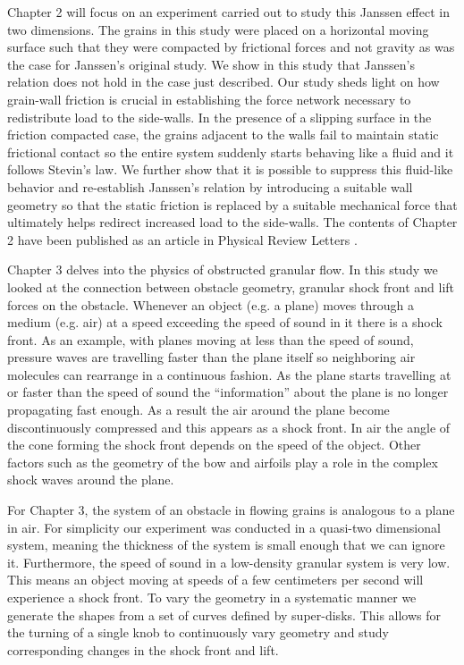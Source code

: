 Chapter 2 will focus on an experiment carried out to study this Janssen effect in two dimensions. The grains in this study were placed on a horizontal moving surface such that they were compacted by frictional forces and not gravity as was the case for Janssen's original study. We show in this study that Janssen's relation does not hold in the case just described. Our study sheds light on how grain-wall friction is crucial in establishing the force network necessary to redistribute load to the side-walls. In the presence of a slipping surface in the friction compacted case, the grains adjacent to the walls fail to maintain static frictional contact so the entire system suddenly starts behaving like a fluid and it follows Stevin's law. We further show that it is possible to suppress this fluid-like behavior and re-establish Janssen's relation by introducing a suitable wall geometry so that the static friction is replaced by a suitable mechanical force that ultimately helps redirect increased load to the side-walls. The contents of Chapter 2 have been published as an article in Physical Review Letters \cite{karim_corwin}. 

Chapter 3 delves into the physics of obstructed granular flow. In this study we looked at the connection between obstacle geometry, granular shock front and lift forces on the obstacle. Whenever an object (e.g. a plane) moves through a medium (e.g. air) at a speed exceeding the speed of sound in it there is a shock front. As an example, with planes moving at less than the speed of sound, pressure waves are travelling faster than the plane itself so neighboring air molecules can rearrange in a continuous fashion. As the plane starts travelling at or faster than the speed of sound the “information” about the plane is no longer propagating fast enough. As a result the air around the plane become discontinuously compressed and this appears as a shock front. In air the angle of the cone forming the shock front depends on the speed of the object. Other factors such as the geometry of the bow and airfoils play a role in the complex shock waves around the plane. 

For Chapter 3, the system of an obstacle in flowing grains is analogous to a plane in air. For simplicity our experiment was conducted in a quasi-two dimensional system, meaning the thickness of the system is small enough that we can ignore it. Furthermore, the speed of sound in a low-density granular system is very low. This means an object moving at speeds of a few centimeters per second will experience a shock front. To vary the geometry in a systematic manner we generate the shapes from a set of curves defined by super-disks. This allows for the turning of a single knob to continuously vary geometry and study corresponding changes in the shock front and lift. 

